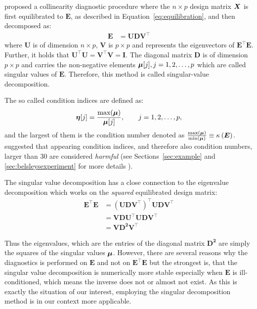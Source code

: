 \documentclass[11pt,a4paper,twoside]{book}\usepackage[]{graphicx}\usepackage[]{xcolor}
\begin{document}
\cite{Belsley1991} proposed a collinearity diagnostic procedure where the $n\times p$ design matrix ${\boldsymbol{X}}$ is first equilibrated to $\boldsymbol{E}$, as described in Equation~\eqref{eq:equilibration}, and then decomposed as:
\begin{align*}
\boldsymbol{E}&=\boldsymbol{UDV^\top}
\end{align*}
where $\boldsymbol{U}$ is of dimension $n\times p$, $\boldsymbol{V}$ is $p\times p$ and represents the eigenvectors of $\boldsymbol{E^\top E}$. Further, it holds that $\boldsymbol{U^\top U}=\boldsymbol{V^\top V}=\boldsymbol{I}$. The diagonal matrix $\boldsymbol{D}$ is of dimension $p\times p$ and carries the non-negative elements ${\boldsymbol{\mu}}[j], j=1,2,\dots,p$ which are called singular values of $\boldsymbol{E}$.
Therefore, this method is called singular-value decomposition.

The so called condition indices are defined as:
\begin{align*}
\boldsymbol{\eta}[j]=\frac{\text{max}({\boldsymbol{\mu}})}{{\boldsymbol{\mu}}[j]},\qquad j=1,2,\dots,p,
\end{align*}
and the largest of them is the condition number denoted as $\frac{\text{max}({\boldsymbol{\mu}})}{\text{min}({\boldsymbol{\mu}})}\equiv\kappa\left(\boldsymbol{E}\right)$. \cite{Belsley1991} suggested that appearing condition indices, and therefore also condition numbers, larger than 30 are considered \textit{harmful} (see Sections~\ref{sec:example} and \ref{sec:belsleysexperiment} for more details ).

The singular value decomposition has a close connection to the eigenvalue decomposition which works on the \textit{squared} equilibrated design matrix:
\begin{align*}
\boldsymbol{E^\top E}&=\left(\boldsymbol{UDV^\top}\right)^\top \boldsymbol{UDV^\top}\\
&=\boldsymbol{VDU^\top UDV^\top}\\
&=\boldsymbol{VD^2V^\top}
\end{align*}

Thus the eigenvalues, which are the entries of the diagonal matrix $\boldsymbol{D^2}$ are simply the squares of the singular values ${\boldsymbol{\mu}}$. However, there are several reasons why the diagnostics is performed on $\boldsymbol{E}$ and not on $\boldsymbol{E^\top E}$ but the strongest is, that the singular value decomposition is numerically more stable especially when $\boldsymbol{E}$ is ill-conditioned, which means the inverse does not or almost not exist. As this is exactly the situation of our interest, employing the singular decomposition method is in our context more applicable.
\end{document}
